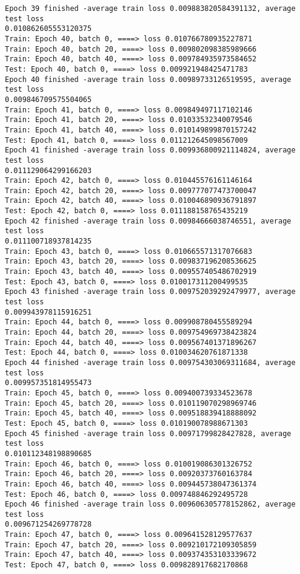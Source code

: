 \documentclass[11pt]{article}
\begin{document}
\begin{Verbatim}[commandchars=\\\{\}]
Epoch 39 finished -average train loss 0.009883820584391132, average test loss
0.010862605553120375
Train: Epoch 40, batch 0, ====> loss 0.010766780935227871
Train: Epoch 40, batch 20, ====> loss 0.009802098385989666
Train: Epoch 40, batch 40, ====> loss 0.009784935973584652
Test: Epoch 40, batch 0, ====> loss 0.009921948425471783
Epoch 40 finished -average train loss 0.00989733126519595, average test loss
0.009846709575504065
Train: Epoch 41, batch 0, ====> loss 0.009849497117102146
Train: Epoch 41, batch 20, ====> loss 0.01033532340079546
Train: Epoch 41, batch 40, ====> loss 0.010149899870157242
Test: Epoch 41, batch 0, ====> loss 0.011212645098567009
Epoch 41 finished -average train loss 0.009936800921114824, average test loss
0.011129064299166203
Train: Epoch 42, batch 0, ====> loss 0.010445576161146164
Train: Epoch 42, batch 20, ====> loss 0.009777077473700047
Train: Epoch 42, batch 40, ====> loss 0.010046890936791897
Test: Epoch 42, batch 0, ====> loss 0.011188158765435219
Epoch 42 finished -average train loss 0.00984666038746551, average test loss
0.011100718937814235
Train: Epoch 43, batch 0, ====> loss 0.010665571317076683
Train: Epoch 43, batch 20, ====> loss 0.009837196208536625
Train: Epoch 43, batch 40, ====> loss 0.009557405486702919
Test: Epoch 43, batch 0, ====> loss 0.010017311200499535
Epoch 43 finished -average train loss 0.009752039292479977, average test loss
0.009943978115916251
Train: Epoch 44, batch 0, ====> loss 0.009908780455589294
Train: Epoch 44, batch 20, ====> loss 0.009754969738423824
Train: Epoch 44, batch 40, ====> loss 0.009567401371896267
Test: Epoch 44, batch 0, ====> loss 0.010034620761871338
Epoch 44 finished -average train loss 0.009754303069311684, average test loss
0.009957351814955473
Train: Epoch 45, batch 0, ====> loss 0.009400739334523678
Train: Epoch 45, batch 20, ====> loss 0.010119070298969746
Train: Epoch 45, batch 40, ====> loss 0.009518839418888092
Test: Epoch 45, batch 0, ====> loss 0.010190078988671303
Epoch 45 finished -average train loss 0.00971799828427828, average test loss
0.010112348198890685
Train: Epoch 46, batch 0, ====> loss 0.010019086301326752
Train: Epoch 46, batch 20, ====> loss 0.00920373760163784
Train: Epoch 46, batch 40, ====> loss 0.009445738047361374
Test: Epoch 46, batch 0, ====> loss 0.009748846292495728
Epoch 46 finished -average train loss 0.009606305778152862, average test loss
0.009671254269778728
Train: Epoch 47, batch 0, ====> loss 0.009641528129577637
Train: Epoch 47, batch 20, ====> loss 0.009210172109305859
Train: Epoch 47, batch 40, ====> loss 0.009374353103339672
Test: Epoch 47, batch 0, ====> loss 0.009828917682170868

\end{Verbatim}
\end{document}
